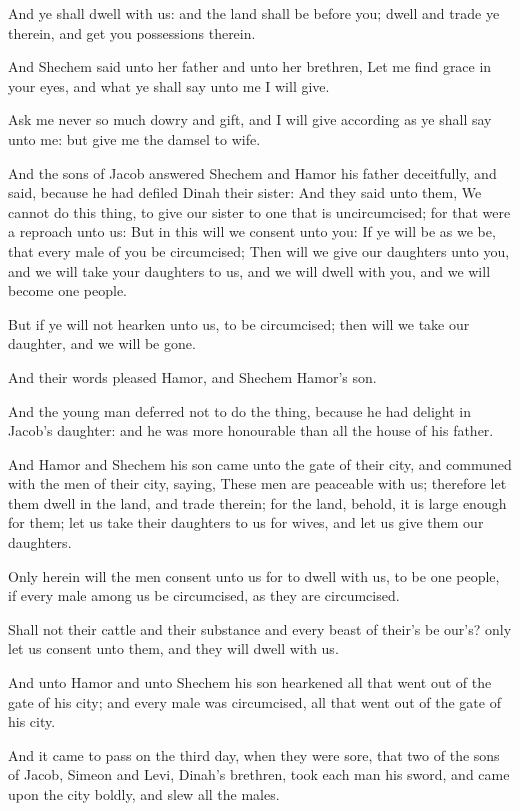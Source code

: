 \verse And ye shall dwell with us: and the land shall be before you;
dwell and trade ye therein, and get you possessions therein.

\verse And Shechem said unto her father and unto her brethren, Let me
find grace in your eyes, and what ye shall say unto me I will give.

\verse Ask me never so much dowry and gift, and I will give according
as ye shall say unto me: but give me the damsel to wife.

\verse And the sons of Jacob answered Shechem and Hamor his father
deceitfully, and said, because he had defiled Dinah their sister:
\verse And they said unto them, We cannot do this thing, to give our
sister to one that is uncircumcised; for that were a reproach unto us:
\verse But in this will we consent unto you: If ye will be as we be,
that every male of you be circumcised; \verse Then will we give our
daughters unto you, and we will take your daughters to us, and we will
dwell with you, and we will become one people.

\verse But if ye will not hearken unto us, to be circumcised; then will
we take our daughter, and we will be gone.

\verse And their words pleased Hamor, and Shechem Hamor's son.

\verse And the young man deferred not to do the thing, because he had
delight in Jacob's daughter: and he was more honourable than all the
house of his father.

\verse And Hamor and Shechem his son came unto the gate of their city,
and communed with the men of their city, saying, \verse These men are
peaceable with us; therefore let them dwell in the land, and trade
therein; for the land, behold, it is large enough for them; let us
take their daughters to us for wives, and let us give them our
daughters.

\verse Only herein will the men consent unto us for to dwell with us,
to be one people, if every male among us be circumcised, as they are
circumcised.

\verse Shall not their cattle and their substance and every beast of
their's be our's? only let us consent unto them, and they will dwell
with us.

\verse And unto Hamor and unto Shechem his son hearkened all that went
out of the gate of his city; and every male was circumcised, all that
went out of the gate of his city.

\verse And it came to pass on the third day, when they were sore, that
two of the sons of Jacob, Simeon and Levi, Dinah's brethren, took each
man his sword, and came upon the city boldly, and slew all the males.

